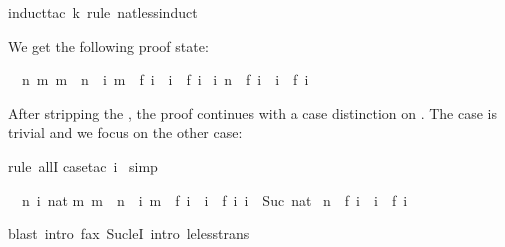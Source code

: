 \begin{isabellebody}
\begin{isamarkuptxt}
\end{isamarkuptxt}%
induct{\isacharunderscore}tac\ k\ rule{\isacharcolon}\ nat{\isacharunderscore}less{\isacharunderscore}induct{\isacharparenright}%
\begin{isamarkuptxt}%
\noindent
We get the following proof state:
\begin{isabelle}%
\ {}{\isachardot}\ {\isasymAnd}n{\isachardot}\ {\isasymforall}m{\isachardot}\ m\ {\isacharless}\ n\ {\isasymlongrightarrow}\ {\isacharparenleft}{\isasymforall}i{\isachardot}\ m\ {\isacharequal}\ f\ i\ {\isasymlongrightarrow}\ i\ {\isasymle}\ f\ i{\isacharparenright}\ {\isasymLongrightarrow}\isanewline
{}i{\isachardot}\ n\ {\isacharequal}\ f\ i\ {\isasymlongrightarrow}\ i\ {\isasymle}\ f\ i%
\end{isabelle}
After stripping the , the proof continues with a case
distinction on . The case  is trivial and we focus on
the other case:%
\end{isamarkuptxt}%
rule\ allI{\isacharparenright}\isanewline
{}case{\isacharunderscore}tac\ i{\isacharparenright}\isanewline
\ simp{\isacharparenright}%
\begin{isamarkuptxt}%
\begin{isabelle}%
\ {}{\isachardot}\ {\isasymAnd}n\ i\ nat{\isachardot}\isanewline
{}m{\isachardot}\ m\ {\isacharless}\ n\ {\isasymlongrightarrow}\ {\isacharparenleft}{\isasymforall}i{\isachardot}\ m\ {\isacharequal}\ f\ i\ {\isasymlongrightarrow}\ i\ {\isasymle}\ f\ i{\isacharparenright}{\isacharsemicolon}\ i\ {\isacharequal}\ Suc\ nat{\isasymrbrakk}\isanewline
{}\ n\ {\isacharequal}\ f\ i\ {\isasymlongrightarrow}\ i\ {\isasymle}\ f\ i%
\end{isabelle}%
\end{isamarkuptxt}%
blast\ intro{\isacharbang}{\isacharcolon}\ f{\isacharunderscore}ax\ Suc{\isacharunderscore}leI\ intro{\isacharcolon}\ le{\isacharunderscore}less{\isacharunderscore}trans{\isacharparenright}%
\begin{isamarkuptext}%

\end{isamarkuptext}
\end{isabellebody}
